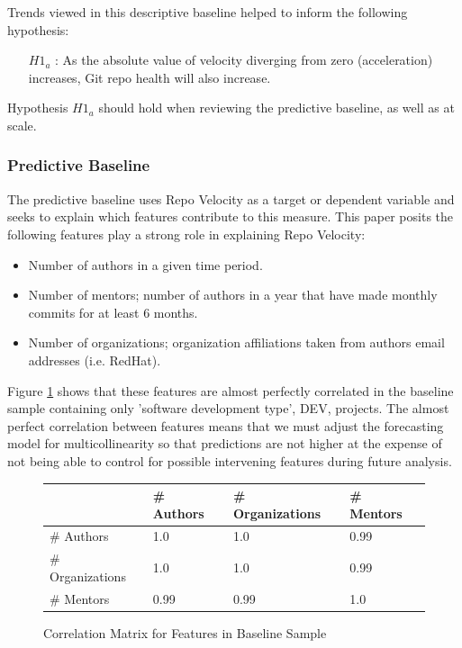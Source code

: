 \documentclass{article}
\begin{document}
Trends viewed in this descriptive baseline helped to inform the following
hypothesis:

\begin{itemize}
\item[$H1_{a}$]: As the absolute value of velocity diverging from zero
  (acceleration) increases, Git repo health will also increase.
\end{itemize}

Hypothesis $H1_{a}$ should hold when reviewing the predictive baseline,
as well as at scale.

\subsubsection{Predictive Baseline}

The predictive baseline uses Repo Velocity as a target or dependent variable
and seeks to explain which features contribute to this measure. This paper
posits the following features play a strong role in explaining Repo Velocity:

\begin{itemize}
\item Number of authors in a given time period.
\item Number of mentors; number of authors in a year that have made monthly
  commits for at least 6 months.
\item Number of organizations; organization affiliations taken from authors
  email addresses (i.e. RedHat).
\end{itemize}

Figure \ref{fig:corr_baseline} shows that these features are almost perfectly
correlated in the baseline sample containing only 'software development
type', DEV, projects. The almost perfect correlation between features
means that we must adjust the forecasting model for multicollinearity so that
predictions are not higher at the expense of not being able to control for
possible intervening features during future analysis.

\begin{figure}[h]
  \centering
  \begin{tabular}{ l|l|l|l }
    & \# Authors & \# Organizations & \# Mentors \\
    \hline
    \# Authors       & 1.0  & 1.0  & 0.99 \\
    \# Organizations & 1.0  & 1.0  & 0.99 \\
    \# Mentors       & 0.99 & 0.99 & 1.0  \\
  \end{tabular}
  \caption{Correlation Matrix for Features in Baseline Sample}
  \label{fig:corr_baseline}
\end{figure}
\end{document}
